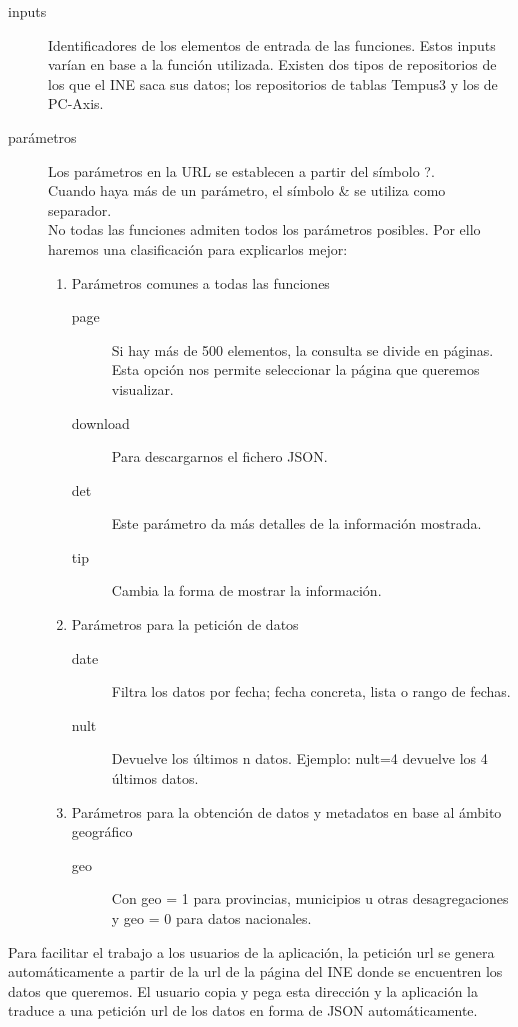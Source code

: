\begin{description}
    \item [inputs] Identificadores de los elementos de entrada de las funciones. Estos inputs varían en base a la función utilizada.
    Existen dos tipos de repositorios de los que el INE saca sus datos; los repositorios de tablas Tempus3 y los de PC-Axis.
    \item [parámetros] Los parámetros en la URL se establecen a partir del símbolo ?.\\
    Cuando haya más de un parámetro, el símbolo \& se utiliza como separador.\\
    No todas las funciones admiten todos los parámetros posibles. Por ello haremos una clasificación para explicarlos mejor:  
     \begin{enumerate}
        \item Parámetros comunes a todas las funciones
            \begin{description}
            \item [page] Si hay más de 500 elementos, la consulta se divide en páginas. Esta opción nos permite seleccionar la página que queremos visualizar.
            \item [download] Para descargarnos el fichero JSON.
            \item [det] Este parámetro da más detalles de la información mostrada.
            \item [tip] Cambia la forma de mostrar la información.
            \end{description}
        \item Parámetros para la petición de datos
            \begin{description}
                \item [date] Filtra los datos por fecha; fecha concreta, lista o rango de fechas.
                \item [nult] Devuelve los últimos n datos. Ejemplo: nult=4 devuelve los 4 últimos datos.
            \end{description}
        \item Parámetros para la obtención de datos y metadatos en base al ámbito geográfico
            \begin{description}
                \item [geo] Con geo = 1 para provincias, municipios u otras desagregaciones y geo = 0 para datos nacionales.
            \end{description}
        \end{enumerate}
\end{description}
 Para facilitar el trabajo a los usuarios de la aplicación, la petición url se genera automáticamente a partir de la url de la página del INE donde se encuentren los datos que queremos.
 El usuario copia y pega esta dirección y la aplicación la traduce a una petición url de los datos en forma de JSON automáticamente.
